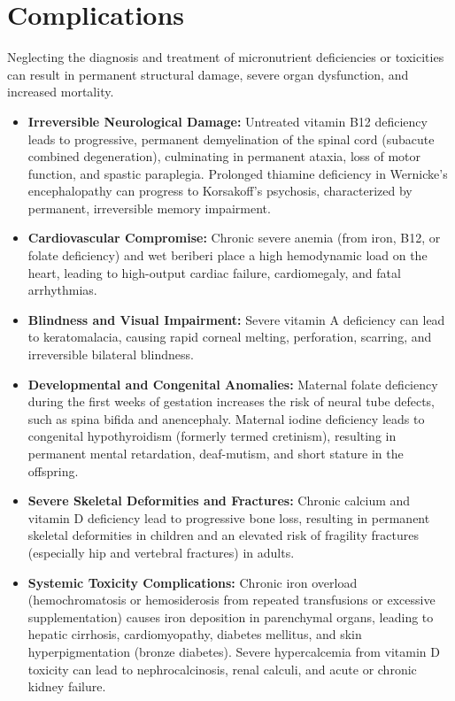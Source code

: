 \section*{Complications}
Neglecting the diagnosis and treatment of micronutrient deficiencies or toxicities can result in permanent structural damage, severe organ dysfunction, and increased mortality.

\begin{itemize}
    \item \textbf{Irreversible Neurological Damage:} Untreated vitamin B12 deficiency leads to progressive, permanent demyelination of the spinal cord (subacute combined degeneration), culminating in permanent ataxia, loss of motor function, and spastic paraplegia. Prolonged thiamine deficiency in Wernicke's encephalopathy can progress to Korsakoff's psychosis, characterized by permanent, irreversible memory impairment.
    \item \textbf{Cardiovascular Compromise:} Chronic severe anemia (from iron, B12, or folate deficiency) and wet beriberi place a high hemodynamic load on the heart, leading to high-output cardiac failure, cardiomegaly, and fatal arrhythmias.
    \item \textbf{Blindness and Visual Impairment:} Severe vitamin A deficiency can lead to keratomalacia, causing rapid corneal melting, perforation, scarring, and irreversible bilateral blindness.
    \item \textbf{Developmental and Congenital Anomalies:} Maternal folate deficiency during the first weeks of gestation increases the risk of neural tube defects, such as spina bifida and anencephaly. Maternal iodine deficiency leads to congenital hypothyroidism (formerly termed cretinism), resulting in permanent mental retardation, deaf-mutism, and short stature in the offspring.
    \item \textbf{Severe Skeletal Deformities and Fractures:} Chronic calcium and vitamin D deficiency lead to progressive bone loss, resulting in permanent skeletal deformities in children and an elevated risk of fragility fractures (especially hip and vertebral fractures) in adults.
    \item \textbf{Systemic Toxicity Complications:} Chronic iron overload (hemochromatosis or hemosiderosis from repeated transfusions or excessive supplementation) causes iron deposition in parenchymal organs, leading to hepatic cirrhosis, cardiomyopathy, diabetes mellitus, and skin hyperpigmentation (bronze diabetes). Severe hypercalcemia from vitamin D toxicity can lead to nephrocalcinosis, renal calculi, and acute or chronic kidney failure.
\end{itemize}

